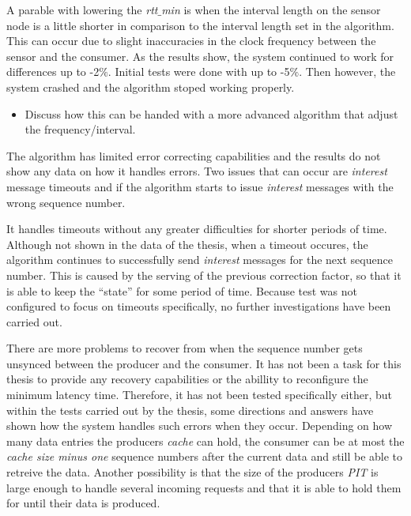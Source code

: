 A parable with lowering the \textit{rtt$\_$min} is when the interval length on the sensor node is a little shorter in comparison to the interval length set in the algorithm. This can occur due to slight inaccuracies in the clock frequency between the sensor and the consumer. 
As the results show, the system continued to work for differences up to -2$\%$. Initial tests were done with up to -5$\%$. Then however, the system crashed and the algorithm stoped working properly.

\begin{itemize}
	\item Discuss how this can be handed with a more advanced algorithm that adjust the frequency/interval.
\end{itemize}

The algorithm has limited error correcting capabilities and the results do not show any data on how it handles errors. Two issues that can occur are \textit{interest} message timeouts and if the algorithm starts to issue \textit{interest} messages with the wrong sequence number. 

It handles timeouts without any greater difficulties for shorter periods of time. Although not shown in the data of the thesis, when a timeout occures, the algorithm continues to successfully send \textit{interest} messages for the next sequence number. This is caused by the serving of the previous correction factor, so that it is able to keep the ``state'' for some period of time. Because test was not configured to focus on timeouts specifically, no further investigations have been carried out.

There are more problems to recover from when the sequence number gets unsynced between the producer and the consumer. 
It has not been a task for this thesis to provide any recovery capabilities or the abillity to reconfigure the minimum latency time. Therefore, it has not been tested specifically either, but within the tests carried out by the thesis, some directions and answers have shown how the system handles such errors when they occur.
Depending on how many data entries the producers \textit{cache} can hold, the consumer can be at most the \textit{cache size minus one} sequence numbers after the current data and still be able to retreive the data. 
Another possibility is that the size of the producers \textit{PIT} is large enough to handle several incoming requests and that it is able to hold them for until their data is produced. 




